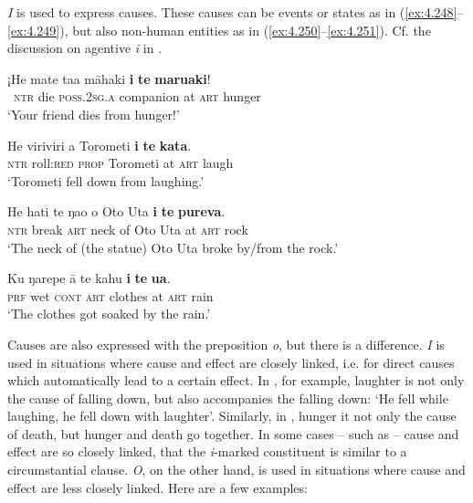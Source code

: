 \textit{{\ꞌ}I} is used to express causes. These causes can be events or states as in (\ref{ex:4.248}–\ref{ex:4.249}), but also non-human entities as in (\ref{ex:4.250}–\ref{ex:4.251}). Cf. the discussion on agentive \textit{i} in .

\ea\label{ex:4.248}
\gll ¡He mate ta{\ꞌ}a māhaki \textbf{{\ꞌ}i} \textbf{te} \textbf{maruaki}! \\
~\textsc{ntr} die \textsc{poss.2sg.a} companion at \textsc{art} hunger \\

\glt 
‘Your friend dies from hunger!’ \textstyleExampleref{[R245.142]} 
\z

\ea\label{ex:4.249}
\gll He viriviri a Torometi \textbf{{\ꞌ}i} \textbf{te} \textbf{kata}. \\
\textsc{ntr}\textsc{} roll:\textsc{red} \textsc{prop} Torometi at \textsc{art} laugh \\

\glt 
‘Torometi fell down from laughing.’ \textstyleExampleref{[R245.105]} 
\z

\ea\label{ex:4.250}
\gll He hati te ŋao o {\ꞌ}Oto {\ꞌ}Uta \textbf{{\ꞌ}i} \textbf{te} \textbf{pureva}. \\
\textsc{ntr} break \textsc{art} neck of Oto Uta at \textsc{art} rock \\

\glt 
‘The neck of (the statue) Oto Uta broke by/from the rock.’ \textstyleExampleref{[MsE-089.002]}
\z

\ea\label{ex:4.251}
\gll Ku ŋarepe {\ꞌ}ā te kahu \textbf{{\ꞌ}i} \textbf{te} \textbf{{\ꞌ}ua}. \\
\textsc{prf} wet \textsc{cont} \textsc{art} clothes at \textsc{art} rain \\

\glt 
‘The clothes got soaked by the rain.’ 
\z

Causes are also expressed with the preposition \textit{{\ꞌ}o}, but there is a difference. \textit{{\ꞌ}I} is used in situations where cause and effect are closely linked, i.e. for direct causes which automatically lead to a certain effect. In , for example, laughter is not only the cause of falling down, but also accompanies the falling down: ‘He fell while laughing, he fell down with laughter’. Similarly, in , hunger it not only the cause of death, but hunger and death go together. In some cases – such as  – cause and effect are so closely linked, that the \textit{{\ꞌ}i}\nobreakdash-marked constituent is similar to a circumstantial clause. \textit{{\ꞌ}O}, on the other hand, is used in situations where cause and effect are less closely linked. Here are a few examples:

